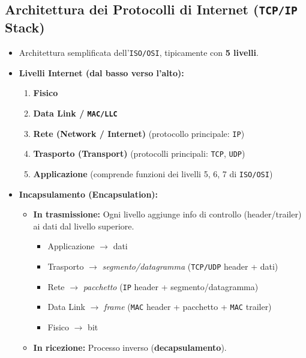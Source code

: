 \documentclass{article}
\begin{document}
\subsection{Architettura dei Protocolli di Internet (\texttt{TCP/IP} Stack)}
\begin{itemize}
    \item Architettura semplificata dell'\texttt{ISO/OSI}, tipicamente con \textbf{5 livelli}.
    \item \textbf{Livelli Internet (dal basso verso l'alto):}
    \begin{enumerate}
        \item \textbf{Fisico}
        \item \textbf{Data Link / \texttt{MAC/LLC}}
        \item \textbf{Rete (Network / Internet)} (protocollo principale: \texttt{IP})
        \item \textbf{Trasporto (Transport)} (protocolli principali: \texttt{TCP}, \texttt{UDP})
        \item \textbf{Applicazione} (comprende funzioni dei livelli 5, 6, 7 di \texttt{ISO/OSI})
    \end{enumerate}
    \item \textbf{Incapsulamento (Encapsulation):}
    \begin{itemize}
        \item \textbf{In trasmissione:} Ogni livello aggiunge info di controllo (header/trailer) ai dati dal livello superiore.
        \begin{itemize}
            \item Applicazione $\rightarrow$ dati
            \item Trasporto $\rightarrow$ \textit{segmento/datagramma} (\texttt{TCP/UDP} header + dati)
            \item Rete $\rightarrow$ \textit{pacchetto} (\texttt{IP} header + segmento/datagramma)
            \item Data Link $\rightarrow$ \textit{frame} (\texttt{MAC} header + pacchetto + \texttt{MAC} trailer)
            \item Fisico $\rightarrow$ bit
        \end{itemize}
        \item \textbf{In ricezione:} Processo inverso (\textbf{decapsulamento}).
    \end{itemize}
\end{itemize}
\end{document}
